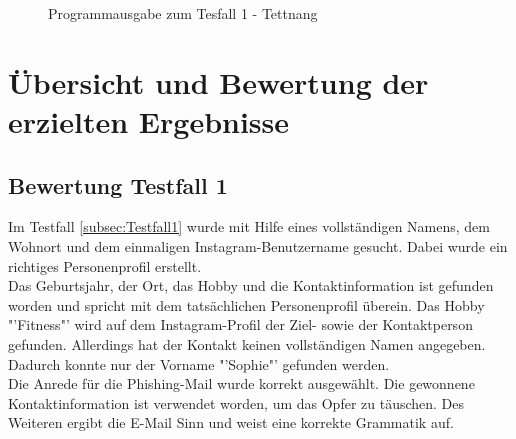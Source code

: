 			\begin{figure}[h!]
				\caption{Programmausgabe zum Tesfall 1 - Tettnang}
			\end{figure}
			\FloatBarrier
			
\section{Übersicht und Bewertung der erzielten Ergebnisse}
	\subsection{Bewertung Testfall 1}
	Im Testfall \ref{subsec:Testfall1} wurde mit Hilfe eines vollständigen Namens, dem Wohnort und dem einmaligen Instagram-Benutzername gesucht. Dabei wurde ein richtiges Personenprofil erstellt.\\
	Das Geburtsjahr, der Ort, das Hobby und die Kontaktinformation ist gefunden worden und spricht mit dem tatsächlichen Personenprofil überein. Das Hobby "'Fitness"' wird auf dem Instagram-Profil der Ziel- sowie der Kontaktperson gefunden. Allerdings hat der Kontakt keinen vollständigen Namen angegeben. Dadurch konnte nur der Vorname "'Sophie"' gefunden werden.\\
	Die Anrede für die Phishing-Mail wurde korrekt ausgewählt. Die gewonnene Kontaktinformation ist verwendet worden, um das Opfer zu täuschen. Des Weiteren ergibt die E-Mail Sinn und weist eine korrekte Grammatik auf. 
